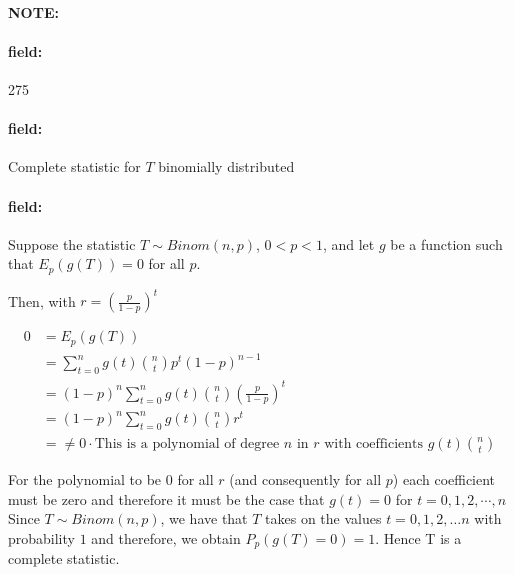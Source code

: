 \documentclass[12pt]{article}
\newenvironment{note}{\paragraph{NOTE:}}{}
\newenvironment{field}{\paragraph{field:}}{}
\begin{document}
\begin{note} \begin{field} \tiny 275 \end{field}
  \begin{field}
    Complete statistic for $T$ binomially distributed
  \end{field}
  \begin{field}
    Suppose the statistic $T \sim Binom(n,p)$, $0 < p < 1$, and let $g$ be a function such that $E_p(g(T)) = 0$ for all $p$.

    Then, with $r = (\frac{p}{1-p})^t$

    \begin{align*}
      0 &= E_p(g(T))\\
      &= \sum_{t=0}^n g(t) \binom{n}{t}p^t(1-p)^{n-1}\\
      &= (1-p)^n \sum_{t = 0}^n g(t)\binom{n}{t}(\frac{p}{1-p})^t\\
      &= (1-p)^n \sum_{t = 0}^n g(t)\binom{n}{t}r^t\\
      &= \neq 0 \cdot \text{This is a polynomial of degree }n \text{ in } r \text{ with coefficients } g(t)\binom{n}{t}
    \end{align*}

    For the polynomial to be $0$ for all $r$ (and consequently for all $p$) each coefficient must be zero and therefore it must be the case that $g(t) = 0$ for $t = 0, 1, 2, \cdots , n$ Since $T \sim Binom(n,p)$, we have that $T$ takes on the values $t = 0,1,2,\ldots n$ with probability $1$ and therefore, we obtain $P_p(g(T)=0)=1$. Hence T is a complete statistic.
  \end{field}
\end{note}
\end{document}
